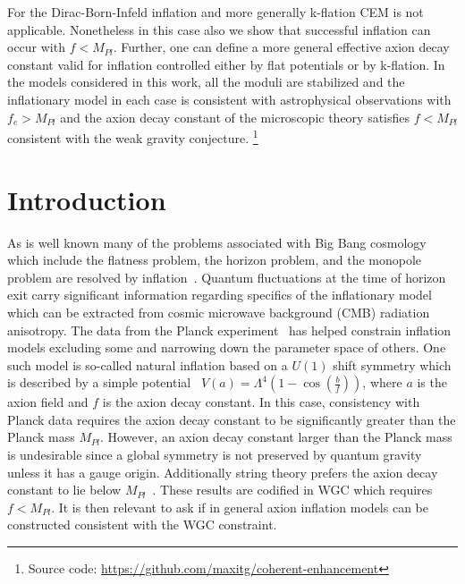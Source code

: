 \documentclass[12pt]{article}
\begin{document}
For the Dirac-Born-Infeld inflation and more generally k-flation CEM is not applicable.
Nonetheless in this case also we show that successful inflation can occur with $f < M_{Pl}$.
Further, one can define a more general effective axion decay constant valid for inflation controlled either by flat potentials or by k-flation.
In the models considered in this work, all the moduli are stabilized and the inflationary model in each case is consistent with astrophysical observations with $f_e > M_{Pl}$ and the axion decay constant of the microscopic theory satisfies $f < M_{Pl}$ consistent with the weak gravity conjecture.
\footnote{Source code: \url{https://github.com/maxitg/coherent-enhancement}}
\newpage

\section{Introduction \label{sec:Introduction}}
As is well known many of the problems associated with Big Bang cosmology which include
the flatness problem, the horizon problem, and the monopole problem are resolved by inflation~\cite{Guth:1980zm, Starobinsky:1980te, Linde:1981mu, Albrecht:1982wi, Sato:1980yn, Linde:1983gd}.
Quantum fluctuations at the time of horizon exit carry significant information regarding specifics of the inflationary model~\cite{Mukhanov:1981xt, Hawking:1982cz, Starobinsky:1982ee, Guth:1982ec, Bardeen:1983qw, Cheung:2007st} which can be extracted from cosmic microwave background (CMB) radiation anisotropy.
The data from the Planck experiment~\cite{Akrami:2018vks, Akrami:2018odb, Array:2015xqh} has helped constrain inflation models excluding some and narrowing down the parameter space of others.
One such model is so-called natural inflation based on a $U(1)$ shift symmetry which is described by a simple potential~\cite{Freese:1990rb, Adams:1992bn} $V\left(a\right) = \Lambda^4 \left(1 - \cos\left(\frac{b}{f}\right)\right)$, where $a$ is the axion field and $f$ is the axion decay constant.
In this case, consistency with Planck data requires the axion decay constant to be significantly greater than the Planck mass $M_{Pl}$.
However, an axion decay constant larger than the Planck mass is undesirable since a global symmetry is not preserved by quantum gravity unless it has a gauge origin.
Additionally string theory prefers the axion decay constant to lie below $M_{Pl}$~\cite{Banks:2003sx, Svrcek:2006yi}.
These results are codified in WGC which requires $f < M_{Pl}$.
It is then relevant to ask if in general axion inflation models can be constructed consistent with the WGC constraint.
\end{document}
